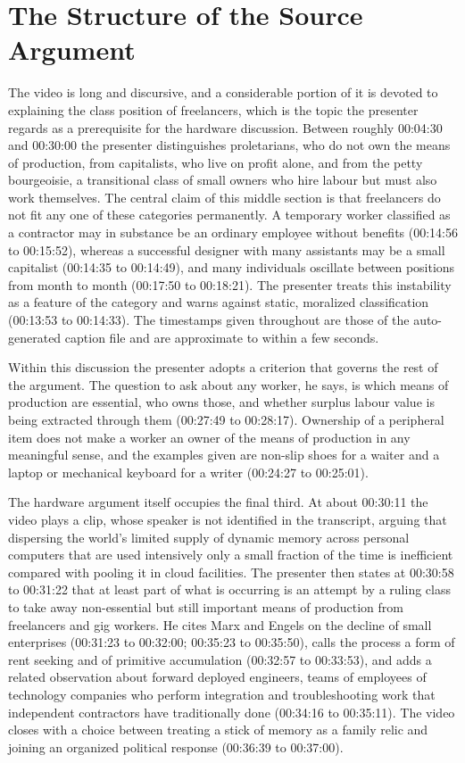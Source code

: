 \documentclass[11pt]{article}
\theoremstyle{plain}
\theoremstyle{definition}
\begin{document}
\section{The Structure of the Source Argument}

The video is long and discursive, and a considerable portion of it is devoted to explaining the class position of freelancers, which is the topic the presenter regards as a prerequisite for the hardware discussion. Between roughly 00:04:30 and 00:30:00 the presenter distinguishes proletarians, who do not own the means of production, from capitalists, who live on profit alone, and from the petty bourgeoisie, a transitional class of small owners who hire labour but must also work themselves. The central claim of this middle section is that freelancers do not fit any one of these categories permanently. A temporary worker classified as a contractor may in substance be an ordinary employee without benefits (00:14:56 to 00:15:52), whereas a successful designer with many assistants may be a small capitalist (00:14:35 to 00:14:49), and many individuals oscillate between positions from month to month (00:17:50 to 00:18:21). The presenter treats this instability as a feature of the category and warns against static, moralized classification (00:13:53 to 00:14:33). The timestamps given throughout are those of the auto-generated caption file and are approximate to within a few seconds.

Within this discussion the presenter adopts a criterion that governs the rest of the argument. The question to ask about any worker, he says, is which means of production are essential, who owns those, and whether surplus labour value is being extracted through them (00:27:49 to 00:28:17). Ownership of a peripheral item does not make a worker an owner of the means of production in any meaningful sense, and the examples given are non-slip shoes for a waiter and a laptop or mechanical keyboard for a writer (00:24:27 to 00:25:01).

The hardware argument itself occupies the final third. At about 00:30:11 the video plays a clip, whose speaker is not identified in the transcript, arguing that dispersing the world's limited supply of dynamic memory across personal computers that are used intensively only a small fraction of the time is inefficient compared with pooling it in cloud facilities. The presenter then states at 00:30:58 to 00:31:22 that at least part of what is occurring is an attempt by a ruling class to take away non-essential but still important means of production from freelancers and gig workers. He cites Marx and Engels on the decline of small enterprises (00:31:23 to 00:32:00; 00:35:23 to 00:35:50), calls the process a form of rent seeking and of primitive accumulation (00:32:57 to 00:33:53), and adds a related observation about forward deployed engineers, teams of employees of technology companies who perform integration and troubleshooting work that independent contractors have traditionally done (00:34:16 to 00:35:11). The video closes with a choice between treating a stick of memory as a family relic and joining an organized political response (00:36:39 to 00:37:00).
\end{document}
